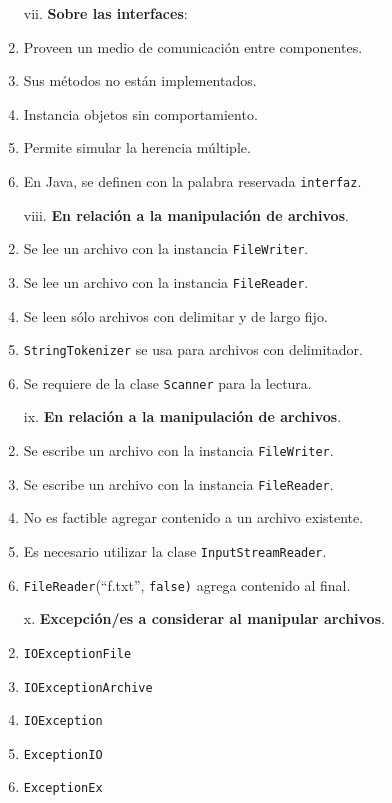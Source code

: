 \documentclass[10pt]{article}
\begin{document}
{\begin{enumerate}
\begin{multicols}{2}
			\begin{enumerate}[label=(\alph*)]
                \item[vii.] \textbf{Sobre las interfaces}:
				 \item Proveen un medio de comunicaci\'on entre componentes.
				 \item Sus m\'etodos no est\'an implementados.
                \item Instancia objetos sin comportamiento.
				 \item Permite simular la herencia m\'ultiple.
				 \item En Java, se definen con la palabra reservada \texttt{interfaz}.
            \end{enumerate}

			\begin{enumerate}[label=(\alph*)]
				\item[viii.] \textbf{En relaci\'on a la manipulaci\'on de archivos}.
				\item Se lee un archivo con la instancia \texttt{FileWriter}.
				\item Se lee un archivo con la instancia \texttt{FileReader}.
				\item Se leen s\'olo archivos con delimitar y de largo fijo.
				\item \texttt{StringTokenizer} se usa para archivos con delimitador.
				\item Se requiere de la clase \texttt{Scanner} para la lectura.
			\end{enumerate}

			\begin{enumerate}[label=(\alph*)]
				\item[ix.] \textbf{En relaci\'on a la manipulaci\'on de archivos}.
				\item Se escribe un archivo con la instancia \texttt{FileWriter}.
				\item Se escribe un archivo con la instancia \texttt{FileReader}.
				\item No es factible agregar contenido a un archivo existente.
				\item Es necesario utilizar la clase \texttt{InputStreamReader}.
				\item \texttt{FileReader}(``f.txt'', \texttt{false)} agrega contenido al final.
			\end{enumerate}

			\begin{enumerate}[label=(\alph*)]
				\item[x.] \textbf{Excepci\'on/es a considerar al manipular archivos}.
				\item \texttt{IOExceptionFile} 
				\item \texttt{IOExceptionArchive} 
				\item \texttt{IOException}
				\item \texttt{ExceptionIO}
				\item \texttt{ExceptionEx}
			\end{enumerate}
		\end{multicols}
		

\end{enumerate}}
\end{document}
